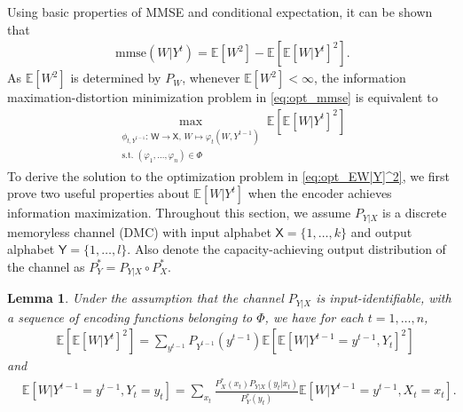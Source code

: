 \documentclass{article}
\newtheorem{lemma}{Lemma}
\newcommand{\E}{\mathbb{E}}
\def\sW{{\mathsf W}}
\def\sX{{\mathsf X}}
\def\sY{{\mathsf Y}}
\begin{document}
Using basic properties of MMSE and conditional expectation, it can be shown that
\begin{align}
\text{   mmse}(W|Y^t) =
    \E[W^2]- \E[\E[W|Y^t]^2] .
\end{align}
As $\E[W^2]$ is determined by $P_W$, whenever $\E[W^2]<\infty$, the information maximation-distortion minimization problem in \eqref{eq:opt_mmse} is equivalent to
\begin{align}
    \max_{\substack{\phi_{t,Y^{t-1}}:\,\sW \rightarrow \sX, \, W\mapsto \varphi_t(W, Y^{t-1}) \\ \text{s.t. } (\varphi_1, \ldots, \varphi_n)\in\mathsf\Phi}} \E[\E[W|Y^{t}]^2] \label{eq:opt_EW|Y]^2}
\end{align}
To derive the solution to the optimization problem in \eqref{eq:opt_EW|Y]^2}, we first prove two useful properties about $\E[W|Y^t]$ when the encoder achieves information maximization.
Throughout this section, we assume $P_{Y|X}$ is a discrete memoryless channel (DMC) with input alphabet $\sX=\{1,\ldots,k\}$ and output alphabet $\sY=\{1,\ldots,l\}$. Also denote the capacity-achieving output distribution of the channel as $P_Y^* = P_{Y|X}\circ P_X^*$.
\begin{lemma}\label{lm:E[W|Y]}
Under the assumption that the channel $P_{Y|X}$ is input-identifiable, with a sequence of encoding functions belonging to $\mathsf\Phi$, we have for each $t=1,\ldots,n$,
\begin{align}
& \E[\E[W|Y^{t}]^2] 
=\sum_{y^{t-1}}P_{Y^{t-1}}(y^{t-1}) \E[\E[W|Y^{t-1}=y^{t-1}, Y_t]^2] \label{eq:lm_E[W|Yt]_1}
\end{align}
and
\begin{align}
& \E[W|Y^{t-1}=y^{t-1}, Y_t = y_t] = 
\sum_{x_t}\frac{P_{X}^*(x_t) P_{Y|X}(y_t|x_t)}{P_{Y}^*(y_t)} \E[W|Y^{t-1}=y^{t-1}, X_t=x_t] . \label{eq:lm_E[W|Yt]_2}
\end{align}
\end{lemma}
\end{document}

